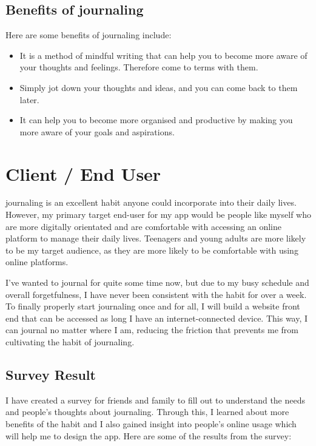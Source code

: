 \subsection{Benefits of journaling}
Here are some benefits of journaling include:
\begin{itemize}
  \item It is a method of mindful writing that can help you to become more aware of your thoughts and feelings. Therefore come to terms with them.
  \item Simply jot down your thoughts and ideas, and you can come back to them later.
  \item It can help you to become more organised and productive by making you more aware of your goals and aspirations.
\end{itemize}

\bigskip

\section{Client / End User}

\newcommand{\question}[1]{\item[Q\refstepcounter{question}\thequestion.] \textit{#1}}
\newcommand{\answer}[1]{\item[A\thequestion.] #1}

journaling is an excellent habit anyone could incorporate into their daily lives. However, my primary target end-user for my app would be people like myself who are more digitally orientated and are comfortable with accessing an online platform to manage their daily lives. Teenagers and young adults are more likely to be my target audience, as they are more likely to be comfortable with using online platforms.

I've wanted to journal for quite some time now, but due to my busy schedule and overall forgetfulness, I have never been consistent with the habit for over a week. To finally properly start journaling once and for all, I will build a website front end that can be accessed as long I have an internet-connected device. This way, I can journal no matter where I am, reducing the friction that prevents me from cultivating the habit of journaling.

\subsection{Survey Result}
I have created a survey for friends and family to fill out to understand the needs and people's thoughts about journaling. Through this, I learned about more benefits of the habit and I also gained insight into people's online usage which will help me to design the app. Here are some of the results from the survey:


